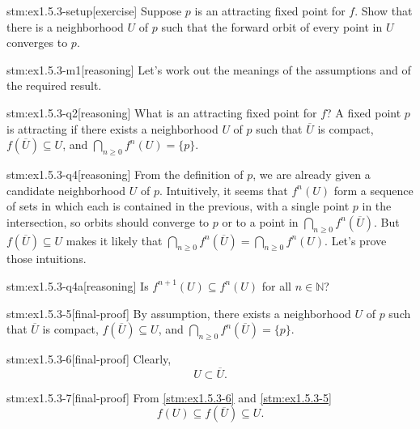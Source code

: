 
\begin{stm}{stm:ex1.5.3-setup}[exercise]
Suppose $p$ is an attracting fixed point for $f$. Show that there is a neighborhood $U$ of $p$ such that the forward orbit of every point in $U$ converges to $p$.
\end{stm}


\begin{stm}{stm:ex1.5.3-m1}[reasoning]
Let's work out the meanings of the assumptions and of the required result.
\end{stm}

\begin{stm}{stm:ex1.5.3-q2}[reasoning]
What is an attracting fixed point for $f$? A fixed point $p$ is attracting if there exists a neighborhood $U$ of $p$ such that $\overline{U}$ is compact, $f(\overline{U}) \subseteq U$, and $\bigcap_{n \ge 0} f^n(U) = \{p\}$.
\end{stm}

\begin{stm}{stm:ex1.5.3-q4}[reasoning]
From the definition of $p$, we are already given a candidate neighborhood $U$ of $p$. Intuitively, it seems that $f^n(U)$ form a sequence of sets in which each is contained in the previous, with a single point $p$ in the intersection, so orbits should converge to $p$ or to a point in $\bigcap_{n \ge 0} f^n(\overline{U})$. But $f(\overline{U}) \subseteq U$ makes it likely that $\bigcap_{n \ge 0} f^n(\overline{U}) = \bigcap_{n \ge 0} f^n(U)$. Let's prove those intuitions.
\end{stm}

\begin{stm}{stm:ex1.5.3-q4a}[reasoning]
Is $f^{n+1}(U) \subseteq f^n(U)$ for all $n \in \mathbb{N}$?
\end{stm}

\begin{stm}{stm:ex1.5.3-5}[final-proof]
By assumption, there exists a neighborhood $U$ of $p$ such that $\overline{U}$ is compact, $f(\overline{U}) \subseteq U$, and $\bigcap_{n \ge 0} f^n(\overline{U}) = \{p\}$.
\end{stm}


\begin{stm}{stm:ex1.5.3-6}[final-proof]
Clearly,
$$U \subset \overline{U}.$$
\end{stm}

\begin{stm}{stm:ex1.5.3-7}[final-proof]
From \ref{stm:ex1.5.3-6} and \ref{stm:ex1.5.3-5}
$$f(U) \subseteq f(\overline{U}) \subseteq U.$$
\end{stm}

